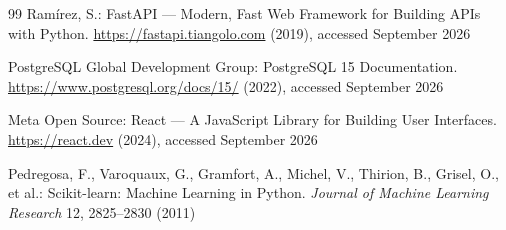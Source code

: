 \documentclass[runningheads]{llncs}
\begin{document}
\begin{thebibliography}{99}
Ram\'irez, S.: FastAPI --- Modern, Fast Web Framework for Building APIs with
Python. \url{https://fastapi.tiangolo.com} (2019), accessed September 2026

PostgreSQL Global Development Group: PostgreSQL 15 Documentation.
\url{https://www.postgresql.org/docs/15/} (2022), accessed September 2026

Meta Open Source: React --- A JavaScript Library for Building User Interfaces.
\url{https://react.dev} (2024), accessed September 2026

Pedregosa, F., Varoquaux, G., Gramfort, A., Michel, V., Thirion, B., Grisel,
O., et al.: Scikit-learn: Machine Learning in Python. \emph{Journal of Machine
Learning Research} 12, 2825--2830 (2011)

\end{thebibliography}
\end{document}

